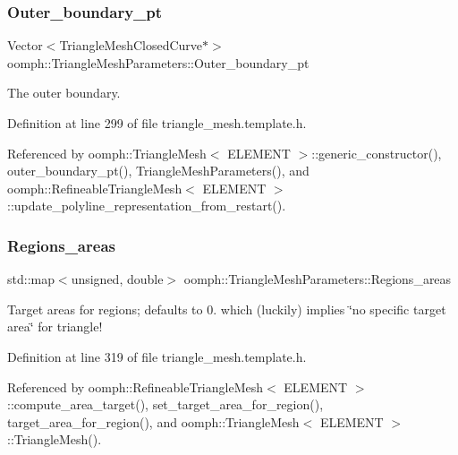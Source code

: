 \subsubsection{\texorpdfstring{Outer\+\_\+boundary\+\_\+pt}{Outer\_boundary\_pt}}
{\footnotesize\ttfamily Vector$<$Triangle\+Mesh\+Closed\+Curve$\ast$$>$ oomph\+::\+Triangle\+Mesh\+Parameters\+::\+Outer\+\_\+boundary\+\_\+pt\hspace{0.3cm}{\ttfamily [protected]}}



The outer boundary. 



Definition at line 299 of file triangle\+\_\+mesh.\+template.\+h.



Referenced by oomph\+::\+Triangle\+Mesh$<$ E\+L\+E\+M\+E\+N\+T $>$\+::generic\+\_\+constructor(), outer\+\_\+boundary\+\_\+pt(), Triangle\+Mesh\+Parameters(), and oomph\+::\+Refineable\+Triangle\+Mesh$<$ E\+L\+E\+M\+E\+N\+T $>$\+::update\+\_\+polyline\+\_\+representation\+\_\+from\+\_\+restart().

\mbox{\label{classoomph_1_1TriangleMeshParameters_acab056faae14c8124fed117bd24db277}} 
\subsubsection{\texorpdfstring{Regions\+\_\+areas}{Regions\_areas}}
{\footnotesize\ttfamily std\+::map$<$unsigned, double$>$ oomph\+::\+Triangle\+Mesh\+Parameters\+::\+Regions\+\_\+areas\hspace{0.3cm}{\ttfamily [protected]}}



Target areas for regions; defaults to 0. which (luckily) implies \char`\"{}no specific target area\char`\"{} for triangle! 



Definition at line 319 of file triangle\+\_\+mesh.\+template.\+h.



Referenced by oomph\+::\+Refineable\+Triangle\+Mesh$<$ E\+L\+E\+M\+E\+N\+T $>$\+::compute\+\_\+area\+\_\+target(), set\+\_\+target\+\_\+area\+\_\+for\+\_\+region(), target\+\_\+area\+\_\+for\+\_\+region(), and oomph\+::\+Triangle\+Mesh$<$ E\+L\+E\+M\+E\+N\+T $>$\+::\+Triangle\+Mesh().

